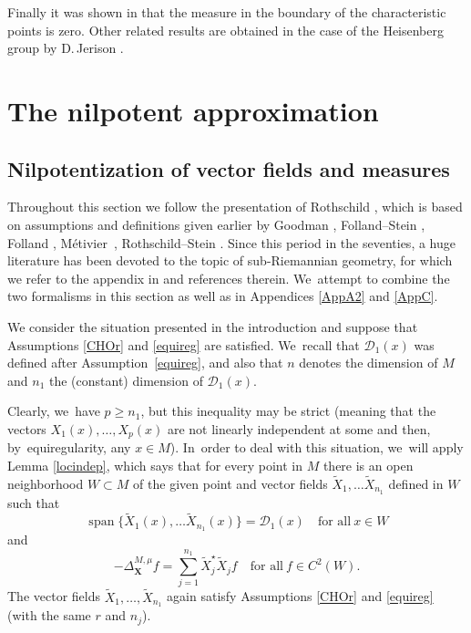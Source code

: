 \documentclass[10pt]{amsart}
\DeclareMathOperator{\Span}{span}
\newcommand{\bX}{{\boldsymbol{X}}}
\theoremstyle{definition}
\newcommand{\1}{\mathbbm{1}}
\begin{document}
Finally it was shown in \cite{De} that the measure in the boundary of the characteristic points is zero. Other related results are obtained in the case of the Heisenberg group by D.\,Jerison \cite{Jer}.

\section{The nilpotent approximation}\label{s1}

\subsection{Nilpotentization of vector fields and measures}
Throughout this section we follow the presentation of Rothschild \cite{Rot}, which is based on assumptions and definitions given earlier by Goodman \cite{Go}, Folland--Stein \cite{FS}, Folland \cite{Fo}, Métivier~\cite{Me}, Rothschild--Stein \cite{RS}. Since this period in the seventies, a huge literature has been devoted to the topic of sub-Riemannian geometry, for which we refer to the appendix in \cite{CHT} and references therein. We~attempt to combine the two formalisms in this section as well as in Appendices \ref{AppA2} and \ref{AppC}.

We consider the situation presented in the introduction and suppose that Assumptions \ref{CHOr} and \ref{equireg} are satisfied. We~recall that $\mathcal D_1(x)$ was defined after Assumption~\ref{equireg}, and also that $n$ denotes the dimension of $M$ and $n_1$ the (constant) dimension of $\mathcal D_1(x)$.

Clearly, we~have $p\geq n_1$, but this inequality may be strict (meaning that the vectors $X_1(x),\ldots,X_p(x)$ are not linearly independent at some and then, by~equiregularity, any $x\in M$). In~order to deal with this situation, we~will apply Lemma \ref{locindep}, which says that for every point in $M$ there is an open neighborhood $W\subset M$ of the given point and vector fields $\tilde X_1,\ldots \tilde X_{n_1}$ defined in $W$ such that
\begin{equation}
\label{eq:loclinindep}
\Span\{ \tilde X_1(x),\ldots \tilde X_{n_1}(x) \} = \mathcal D_1(x)
\quad\text{for all}\ x\in W
\end{equation}
and
\begin{equation}
\label{eq:loclinindeplapl}
-\Delta_\bX^{M,\mu} f = \sum_{j=1}^{n_1} \tilde X_j^\star \tilde X_j f
\quad\text{for all} \ f\in C^2(W).
\end{equation}
The vector fields $\tilde X_1,\ldots,\tilde X_{n_1}$ again satisfy Assumptions \ref{CHOr} and \ref{equireg} (with the same $r$ and $n_j$).
\end{document}
